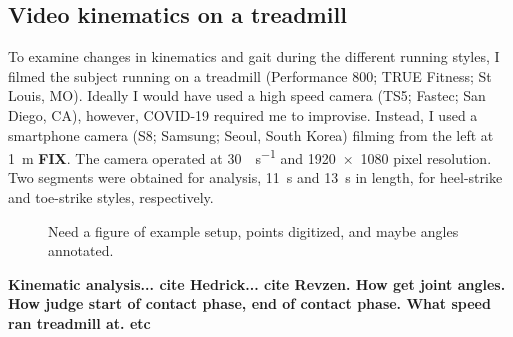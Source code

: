 \subsection{Video kinematics on a treadmill}
To examine changes in kinematics and gait during the different running styles, I filmed the subject running on a treadmill (Performance 800; TRUE Fitness; St Louis, MO). Ideally I would have used a high speed camera (TS5; Fastec; San Diego, CA), however, COVID-19 required me to improvise. Instead, I used a smartphone camera (S8; Samsung; Seoul, South Korea) filming from the left at \SI{1}{\meter} \textbf{FIX}. The camera operated at \SI{30}{\frame\per\second} and \num{1920x1080} pixel resolution. Two segments were obtained for analysis, \SI{11}{\second} and \SI{13}{\second} in length, for heel-strike and toe-strike styles, respectively.
\begin{figure}
\caption{Need a figure of example setup, points digitized, and maybe angles annotated.}
\label{fig:methods:kinematics}
\end{figure}

\textbf{Kinematic analysis... cite Hedrick... cite Revzen. How get joint angles. How judge start of contact phase, end of contact phase. What speed ran treadmill at. etc}